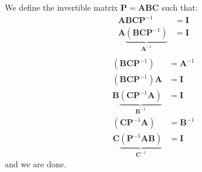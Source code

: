 \begin{sol}
We define the invertible matrix $\bm{P}=\bm{A}\bm{B}\bm{C}$ such that:
\begin{align}
    \bm{A}\bm{B}\bm{C}\bm{P}^{-1} &= \bm{I} \\ 
    \bm{A}\underbrace{\left(\bm{B}\bm{C}\bm{P}^{-1}\right)}_{\bm{A}^{-1}} &= \bm{I} \\
\end{align}
\begin{align}
    \left(\bm{B}\bm{C}\bm{P}^{-1}\right) &= \bm{A}^{-1} \\ 
    \left(\bm{B}\bm{C}\bm{P}^{-1}\right)\bm{A} &= \bm{I} \\ 
    \bm{B}\underbrace{\left(\bm{C}\bm{P}^{-1}\bm{A}\right)}_{\bm{B}^{-1}} &= \bm{I} 
\end{align}
\begin{align}
    \left(\bm{C}\bm{P}^{-1}\bm{A}\right) &= \bm{B}^{-1} \\ 
    \bm{C}\underbrace{\left(\bm{P}^{-1}\bm{A}\bm{B}\right)}_{\bm{C}^{-1}} &= \bm{I}
\end{align}
and we are done.
\end{sol}